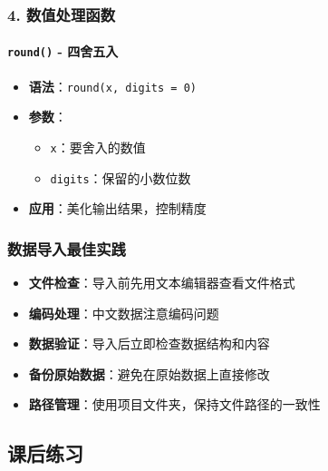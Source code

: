 \documentclass[
]{book}
\providecommand{\tightlist}{%
  \setlength{\itemsep}{0pt}\setlength{\parskip}{0pt}}
\begin{document}
\hypertarget{ux6570ux503cux5904ux7406ux51fdux6570}{%
\subsubsection{4. 数值处理函数}\label{ux6570ux503cux5904ux7406ux51fdux6570}}

\hypertarget{round---ux56dbux820dux4e94ux5165}{%
\paragraph{\texorpdfstring{\texttt{round()} - 四舍五入}{round() - 四舍五入}}\label{round---ux56dbux820dux4e94ux5165}}

\begin{itemize}
\tightlist
\item
  \textbf{语法}：\texttt{round(x,\ digits\ =\ 0)}
\item
  \textbf{参数}：

  \begin{itemize}
  \tightlist
  \item
    \texttt{x}：要舍入的数值
  \item
    \texttt{digits}：保留的小数位数
  \end{itemize}
\item
  \textbf{应用}：美化输出结果，控制精度
\end{itemize}

\hypertarget{ux6570ux636eux5bfcux5165ux6700ux4f73ux5b9eux8df5}{%
\subsubsection{数据导入最佳实践}\label{ux6570ux636eux5bfcux5165ux6700ux4f73ux5b9eux8df5}}

\begin{itemize}
\tightlist
\item
  \textbf{文件检查}：导入前先用文本编辑器查看文件格式
\item
  \textbf{编码处理}：中文数据注意编码问题
\item
  \textbf{数据验证}：导入后立即检查数据结构和内容
\item
  \textbf{备份原始数据}：避免在原始数据上直接修改
\item
  \textbf{路径管理}：使用项目文件夹，保持文件路径的一致性
\end{itemize}

\hypertarget{ux8bfeux540eux7ec3ux4e60-4}{%
\subsection{课后练习}\label{ux8bfeux540eux7ec3ux4e60-4}}
\end{document}
